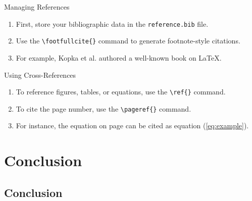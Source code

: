 \documentclass[8pt]{beamer}
\begin{document}
\begin{frame}[fragile]{\insertsection}{\insertsubsection}

    \begin{block}{Managing References}
        \begin{enumerate}
            \item First, store your bibliographic data in the \lstinline|reference.bib| file.
            \item Use the \lstinline|\footfullcite{}| command to generate footnote-style citations.
            \item For example, Kopka et al. authored a well-known book on \LaTeX{}.
        \end{enumerate}
    \end{block}

    \begin{block}{Using Cross-References}
        \begin{enumerate}
            \item To reference figures, tables, or equations, use the \lstinline|\ref{}| command.
            \item To cite the page number, use the \lstinline|\pageref{}| command.
            \item For instance, the equation on page \pageref{frame:eq_and_code} can be cited as equation (\ref{eq:example}).
        \end{enumerate}
    \end{block}

\end{frame}


\section{Conclusion}

\subsection{Conclusion}

\makesection
\end{document}

